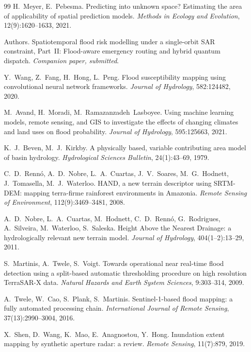 \documentclass[journal]{IEEEtran}
\begin{document}
\begin{thebibliography}{99}
H.~Meyer, E.~Pebesma.
Predicting into unknown space? Estimating the area of applicability of spatial
prediction models.
\emph{Methods in Ecology and Evolution}, 12(9):1620--1633, 2021.

 Authors. Spatiotemporal flood risk modelling under a single-orbit SAR constraint, Part~II: Flood-aware emergency routing and hybrid quantum dispatch. \emph{Companion paper, submitted}.

Y.~Wang, Z.~Fang, H.~Hong, L.~Peng.
Flood susceptibility mapping using convolutional neural network frameworks.
\emph{Journal of Hydrology}, 582:124482, 2020.

M.~Avand, H.~Moradi, M.~Ramazanzadeh~Lasboyee.
Using machine learning models, remote sensing, and GIS to investigate the effects
of changing climates and land uses on flood probability.
\emph{Journal of Hydrology}, 595:125663, 2021.

K.~J.~Beven, M.~J.~Kirkby.
A physically based, variable contributing area model of basin hydrology.
\emph{Hydrological Sciences Bulletin}, 24(1):43--69, 1979.

C.~D.~Renn\'o, A.~D.~Nobre, L.~A.~Cuartas, J.~V.~Soares, M.~G.~Hodnett,
J.~Tomasella, M.~J.~Waterloo.
HAND, a new terrain descriptor using SRTM-DEM: mapping terra-firme rainforest
environments in Amazonia.
\emph{Remote Sensing of Environment}, 112(9):3469--3481, 2008.

A.~D.~Nobre, L.~A.~Cuartas, M.~Hodnett, C.~D.~Renn\'o, G.~Rodrigues, A.~Silveira,
M.~Waterloo, S.~Saleska.
Height Above the Nearest Drainage: a hydrologically relevant new terrain model.
\emph{Journal of Hydrology}, 404(1--2):13--29, 2011.

S.~Martinis, A.~Twele, S.~Voigt.
Towards operational near real-time flood detection using a split-based automatic
thresholding procedure on high resolution TerraSAR-X data.
\emph{Natural Hazards and Earth System Sciences}, 9:303--314, 2009.

A.~Twele, W.~Cao, S.~Plank, S.~Martinis.
Sentinel-1-based flood mapping: a fully automated processing chain.
\emph{International Journal of Remote Sensing}, 37(13):2990--3004, 2016.

X.~Shen, D.~Wang, K.~Mao, E.~Anagnostou, Y.~Hong.
Inundation extent mapping by synthetic aperture radar: a review.
\emph{Remote Sensing}, 11(7):879, 2019.


\end{thebibliography}
\end{document}
